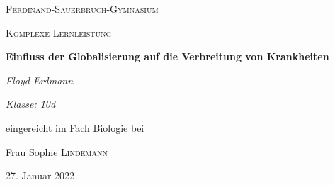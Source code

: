 \documentclass[12pt]{article}
\begin{document}
\setlength{\baselineskip}{5mm}
\onehalfspacing

\begin{titlepage}
	\centering
	{\scshape\LARGE Ferdinand-Sauerbruch-Gymnasium \par}
	\vspace{1cm}
	{\scshape\Large Komplexe Lernleistung\par}
	\vspace{1.5cm}
	{\huge\bfseries Einfluss der Globalisierung auf die Verbreitung von Krankheiten\par}
	\vspace{2cm}
	{\Large\itshape Floyd Erdmann\par}
	{\small\itshape Klasse: 10d\par}%
	\vfill
	eingereicht im Fach Biologie bei\par
	Frau Sophie \textsc{Lindemann}

	\vfill

	{\large27. Januar 2022\par}
\end{titlepage}

\newpage
\tableofcontents
\newpage
\listoffigures
\lstlistoflistings
\newpage
{}
\setcounter{page}{5}
\end{document}
